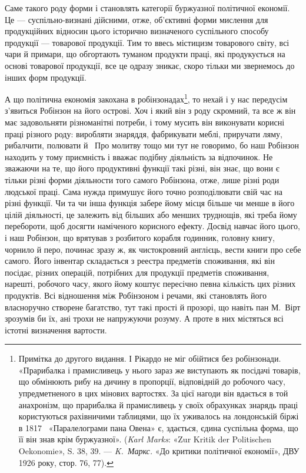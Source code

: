 
Саме такого роду форми і становлять категорії буржуазної
політичної економії. Це — суспільно-визнані дійсними, отже,
об’єктивні форми мислення для продукційних відносин цього
історично визначеного суспільного способу продукції — товарової
продукції. Тим то ввесь містицизм товарового світу, всі чари й
примари, що обгортають туманом продукти праці, які продукується
на основі товарової продукції, все це одразу зникає, скоро
тільки ми звернемось до інших форм продукції.

А що політична економія закохана в робінзонадах\footnote{
Примітка до другого видання. І Рікардо не міг обійтися без робінзонади.
«Прарибалка і прамисливець у нього зараз же виступають
як посідачі товарів, що обмінюють рибу на дичину в пропорції, відповідній
до робочого часу, упредметненого в цих мінових вартостях. За цієї
нагоди він вдається в той анахронізм, що прарибалка й прамисливець
у своїх обрахунках знарядь праці користуються рахівничими таблицями,
що їх уживалось на лондонській біржі в 1817~ «Паралелограми пана
Овена» є, здається, єдина суспільна форма, що її він знав крім буржуазної».
(\emph{Karl Marks}: «Zur Kritik der Politischen Oekonomie», S. 38, 39. —
\emph{K.~Маркс.} «До критики політичної економії», ДВУ 1926 року,
стор. 76, 77).
}, то нехай
і у нас передусім з’явиться Робінзон на його острові. Хоч і який
він з роду скромний, та все ж він має задовольняти різноманітні
потреби, і тому мусить він виконувати корисні праці різного
роду: виробляти знаряддя, фабрикувати меблі, приручати ляму,
рибалчити, полювати й~ Про молитву тощо ми тут не говоримо,
бо наш Робінзон находить у тому приємність і вважає подібну
діяльність за відпочинок. Не зважаючи на те, що його продуктивні
функції такі різні, він знає, що вони є тільки різні форми
діяльности того самого Робінзона, отже, лише різні роди людської
праці. Сама нужда примушує його точно розподілювати свій час
на різні функції. Чи та чи інша функція забере йому місця більше
чи менше в його цілій діяльності, це залежить від більших або
менших труднощів, які треба йому перебороти, щоб досягти наміченого
корисного ефекту. Досвід навчає його цього, і наш Робінзон,
що врятував з розбитого корабля годинник, головну книгу,
чорнило й перо, починає зразу ж, як чистокровний англієць, вести
книги про себе самого. Його інвентар складається з реестра предметів
споживання, які він посідає, різних операцій, потрібних для
продукції предметів споживання, нарешті, робочого часу, якого
йому коштує пересічно певна кількість цих різних продуктів. Всі
відношення між Робінзоном і речами, які становлять його власноручно
створене багатство, тут такі прості й прозорі, що навіть
пан М.~Вірт зрозумів би їх, ані трохи не напружуючи розуму.
А проте в них містяться всі істотні визначення вартости.

